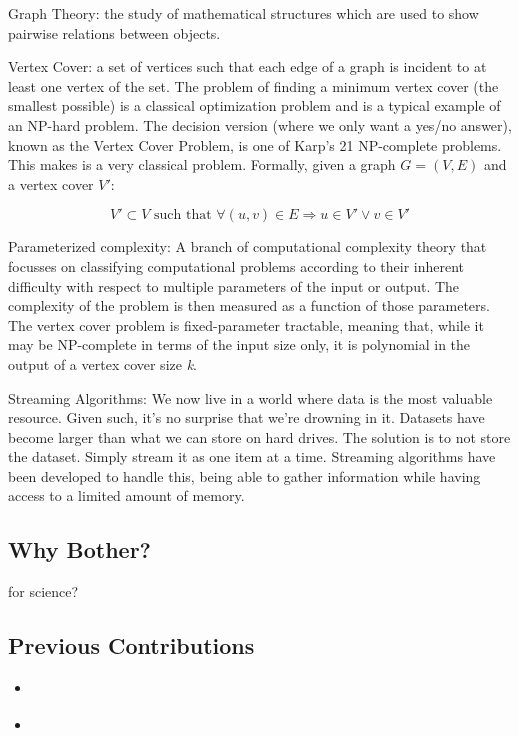 Graph Theory: the study of mathematical structures which are used to show pairwise relations between objects.

Vertex Cover: a set of vertices such that each edge of a graph is incident to at least one vertex of the set. The problem of finding a minimum vertex cover (the smallest possible) is a classical optimization problem and is a typical example of an NP-hard problem. The decision version (where we only want a yes/no answer), known as the Vertex Cover Problem, is one of Karp's 21 NP-complete problems. This makes is a very classical problem. Formally, given a graph \(G = (V, E)\) and a vertex cover \(V'\):

\[V' \subset V \text{ such that } \forall (u, v) \in E \Rightarrow u \in V' \vee v \in V' \]

Parameterized complexity: A branch of computational complexity theory that focusses on classifying computational problems according to their inherent difficulty with respect to multiple parameters of the input or output. The complexity of the problem is then measured as a function of those parameters. The vertex cover problem is fixed-parameter tractable, meaning that, while it may be NP-complete in terms of the input size only, it is polynomial in the output of a vertex cover size \emph{k}.

Streaming Algorithms: We now live in a world where data is the most valuable resource. Given such, it's no surprise that we're drowning in it. Datasets have become larger than what we can store on hard drives. The solution is to not store the dataset. Simply stream it as one item at a time. Streaming algorithms have been developed to handle this, being able to gather information while having access to a limited amount of memory.

\subsection{Why Bother?}

for science?

\subsection{Previous Contributions}

\begin{itemize}
    \item \cite{chitnis_parameterized_2014}
    \item \cite{chitnis_kernelization_2015}
\end{itemize}

